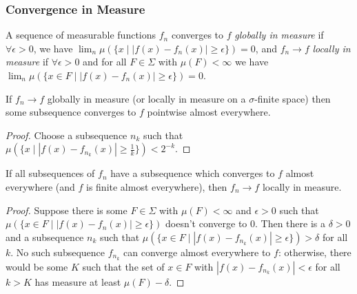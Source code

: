 \documentclass[letterpaper,11pt]{report}
\begin{document}
\subsubsection{Convergence in Measure}

\begin{defn} A sequence of measurable functions $f_n$ converges to $f$ \emph{globally in measure} if $\forall \epsilon > 0$, we have $\lim_n \mu(\{x \mid |f(x) - f_n(x)| \ge \epsilon\}) = 0$, and $f_n \rightarrow f$ \emph{locally in measure} if $\forall \epsilon > 0$ and for all $F \in \Sigma$ with $\mu(F) < \infty$ we have $\lim_n \mu(\{x \in F \mid |f(x) - f_n(x)| \ge \epsilon\}) = 0$.
\end{defn}

\begin{thm}[Riesz] If $f_n \rightarrow f$ globally in measure (or locally in measure on a $\sigma$-finite space) then some subsequence converges to $f$ pointwise almost everywhere.
\end{thm}
\begin{proof} Choose a subsequence $n_k$ such that $\mu(\{x \mid |f(x) - f_{n_k}(x)| \ge \frac{1}{k}\}) < 2^{-k}$.
\end{proof}

\begin{prop} If all subsequences of $f_n$ have a subsequence which converges to $f$ almost everywhere (and $f$ is finite almost everywhere), then $f_n \rightarrow f$ locally in measure.
\end{prop}
\begin{proof} Suppose there is some $F \in \Sigma$ with $\mu(F) < \infty$ and $\epsilon > 0$ such that $\mu(\{x \in F \mid |f(x) - f_n(x)| \ge \epsilon\})$ doesn't converge to $0$. Then there is a $\delta > 0$ and a subsequence $n_k$ such that $\mu(\{x \in F \mid |f(x) - f_{n_k}(x)| \ge \epsilon\}) > \delta$ for all $k$. No such subsequence $f_{n_k}$ can converge almost everywhere to $f$: otherwise, there would be some $K$ such that the set of $x \in F$ with $|f(x) - f_{n_k}(x)| < \epsilon$ for all $k > K$ has measure at least $\mu(F) - \delta$.
\end{proof}


\end{document}
